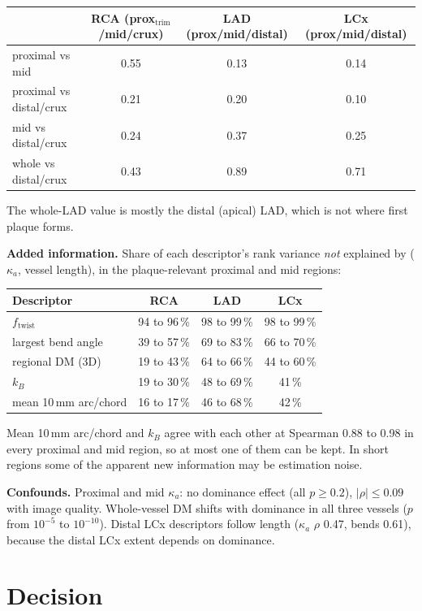 \documentclass[11pt,a4paper]{article}
\newcommand{\ka}{\kappa_a}
\begin{document}
\begin{center}
\small
\begin{tabular}{@{}lccc@{}}
\toprule
 & RCA (prox$_\text{trim}$/mid/crux) & LAD (prox/mid/distal) & LCx (prox/mid/distal)\\
\midrule
proximal vs mid & 0.55 & 0.13 & 0.14\\
proximal vs distal/crux & 0.21 & 0.20 & 0.10\\
mid vs distal/crux & 0.24 & 0.37 & 0.25\\
whole vs distal/crux & 0.43 & 0.89 & 0.71\\
\bottomrule
\end{tabular}
\end{center}
The whole-LAD value is mostly the distal (apical) LAD, which is not where first plaque forms.

\textbf{Added information.} Share of each descriptor's rank variance \emph{not} explained by
($\ka$, vessel length), in the plaque-relevant proximal and mid regions:

\begin{center}
\begin{tabular}{@{}lccc@{}}
\toprule
Descriptor & RCA & LAD & LCx\\
\midrule
$f_{\text{twist}}$ & 94 to 96\,\% & 98 to 99\,\% & 98 to 99\,\%\\
largest bend angle & 39 to 57\,\% & 69 to 83\,\% & 66 to 70\,\%\\
regional DM (3D) & 19 to 43\,\% & 64 to 66\,\% & 44 to 60\,\%\\
$k_B$ & 19 to 30\,\% & 48 to 69\,\% & 41\,\%\\
mean 10\,mm arc/chord & 16 to 17\,\% & 46 to 68\,\% & 42\,\%\\
\bottomrule
\end{tabular}
\end{center}
Mean 10\,mm arc/chord and $k_B$ agree with each other at Spearman 0.88 to 0.98 in every proximal and mid region, so at most
one of them can be kept. In short regions some of the apparent new information may be estimation noise.

\textbf{Confounds.} Proximal and mid $\ka$: no dominance effect (all $p\ge0.2$), $|\rho|\le0.09$ with image quality.
Whole-vessel DM shifts with dominance in all three vessels ($p$ from $10^{-5}$ to $10^{-10}$). Distal LCx
descriptors follow length ($\ka$ $\rho$ 0.47, bends 0.61), because the distal LCx extent depends on dominance.

\section{Decision}
\end{document}
